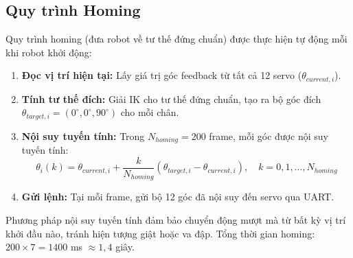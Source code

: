 \subsection{Quy trình Homing}

Quy trình homing (đưa robot về tư thế đứng chuẩn) được thực hiện tự động mỗi khi robot khởi động:

\begin{enumerate}
    \item \textbf{Đọc vị trí hiện tại:} Lấy giá trị góc feedback từ tất cả 12 servo ($\theta_{current,i}$).
    \item \textbf{Tính tư thế đích:} Giải IK cho tư thế đứng chuẩn, tạo ra bộ góc đích $\theta_{target,i} = (0^\circ, 0^\circ, 90^\circ)$ cho mỗi chân.
    \item \textbf{Nội suy tuyến tính:} Trong $N_{homing} = 200$ frame, mỗi góc được nội suy tuyến tính:
    \begin{equation}
        \theta_i(k) = \theta_{current,i} + \frac{k}{N_{homing}} (\theta_{target,i} - \theta_{current,i}), \quad k = 0, 1, \ldots, N_{homing}
    \end{equation}
    \item \textbf{Gửi lệnh:} Tại mỗi frame, gửi bộ 12 góc đã nội suy đến servo qua UART.
\end{enumerate}

Phương pháp nội suy tuyến tính đảm bảo chuyển động mượt mà từ bất kỳ vị trí khởi đầu nào, tránh hiện tượng giật hoặc va đập. Tổng thời gian homing: $200 \times 7 = 1400$ ms $\approx 1{,}4$ giây.

